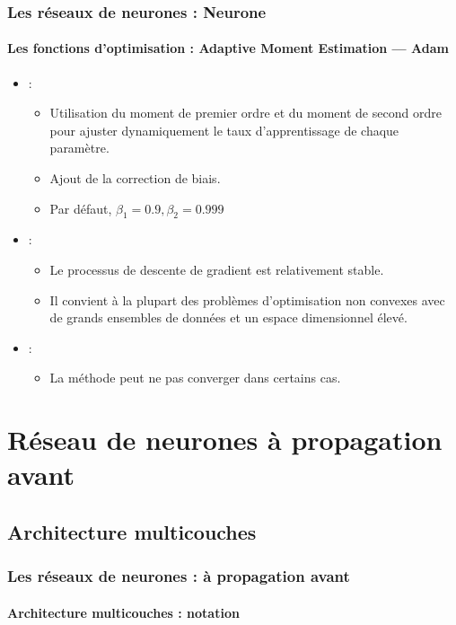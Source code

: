 \documentclass[xcolor=table]{beamer}
\begin{document}
\begin{frame}
\frametitle{Les réseaux de neurones : Neurone}
\framesubtitle{Les fonctions d'optimisation : Adaptive Moment Estimation — Adam}

\begin{itemize}
	\item {} : 
	\begin{itemize}
		\item Utilisation du moment de premier ordre et du moment de second ordre pour ajuster dynamiquement le taux d'apprentissage de chaque paramètre. 
		\item Ajout de la correction de biais.
		\item Par défaut, $\beta_1 = 0.9, \beta_2 = 0.999$ 
	\end{itemize}
	\item {} : 
	\begin{itemize}
		\item Le processus de descente de gradient est relativement stable. 
		\item Il convient à la plupart des problèmes d'optimisation non convexes avec de grands ensembles de données et un espace dimensionnel élevé.
	\end{itemize}
	\item {} : 
	\begin{itemize}
		\item La méthode peut ne pas converger dans certains cas.
	\end{itemize}
\end{itemize}

\end{frame}

\section{Réseau de neurones à propagation avant}

\subsection{Architecture multicouches}

\begin{frame}
\frametitle{Les réseaux de neurones : à propagation avant}
\framesubtitle{Architecture multicouches : notation}


\end{frame}
\end{document}
